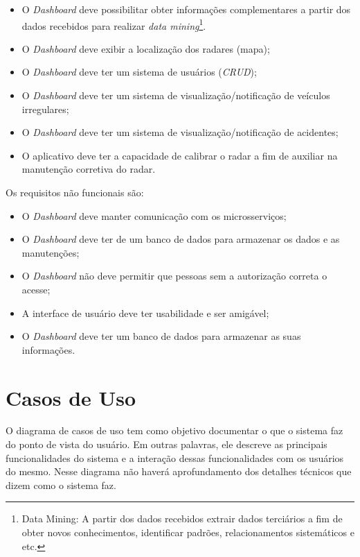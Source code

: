 \begin{itemize}
    \item O \textit{Dashboard} deve possibilitar obter informações complementares a partir dos dados recebidos para realizar \textit{data mining}\footnote{Data Mining: A partir dos dados recebidos extrair dados terciários a fim de obter novos conhecimentos, identificar padrões, relacionamentos sistemáticos e etc.}.
    \item O \textit{Dashboard} deve exibir a localização dos radares (mapa);
    \item O \textit{Dashboard} deve ter um sistema de usuários (\textit{CRUD});
    \item O \textit{Dashboard} deve ter um sistema de visualização/notificação de veículos irregulares;
    \item O \textit{Dashboard} deve ter um sistema de visualização/notificação de acidentes;
    \item O aplicativo deve ter a capacidade de calibrar o radar a fim de auxiliar na manutenção corretiva do radar.
\end{itemize}

Os requisitos não funcionais são:

\begin{itemize}
    \item O \textit{Dashboard} deve manter comunicação com os microsserviços;
    \item O \textit{Dashboard} deve ter de um banco de dados para armazenar os dados e as manutenções;
    \item O \textit{Dashboard} não deve permitir que pessoas sem a autorização correta o acesse;
    \item A interface de usuário deve ter usabilidade e ser amigável;
    \item O \textit{Dashboard} deve ter um banco de dados para armazenar as suas informações.
\end{itemize}

\section{Casos de Uso}

O diagrama de casos de uso tem como objetivo documentar o que o sistema faz do ponto de vista do usuário. Em outras palavras, ele descreve as principais funcionalidades do sistema e a interação dessas funcionalidades com os usuários do mesmo. Nesse diagrama não haverá aprofundamento dos detalhes técnicos que dizem como o sistema faz.

